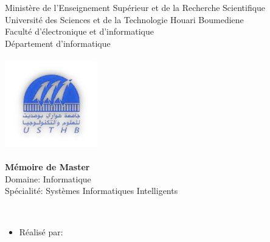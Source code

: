 \documentclass[12pt , a4paper]{report}
\begin{document}
\begin{center}
\normalsize{Ministère de l'Enseignement Supérieur et de la Recherche Scientifique}\\
\normalsize{Université des Sciences et de la Technologie Houari Boumediene}\\
\normalsize{Faculté d'électronique et d'informatique}\\
\normalsize{Département d'informatique}\\
\end{center}
\begin{center}
\includegraphics[width=4cm,height=4cm]{usthb.jpg}
\end{center}


\begin{center}
\Huge{\textbf{Mémoire de Master}}\\
\vspace{0.7cm}
\large{Domaine: Informatique}\\
\vspace{0.2cm}
\large{Spécialité: Systèmes Informatiques Intelligents}\\
\vspace{1.5cm}
\normalsize{\textbf{}}
\end{center}
\vspace{3cm}
\\
\begin{itemize}
    \item{Réalisé par:}
\end{itemize}
\vspace{3cm}
\end{document}
